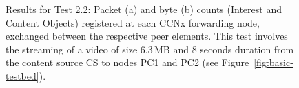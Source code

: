 \begin{figure}[H]
    \centering



    \cprotect\caption{Results for Test 2.2: Packet (a) and byte (b) 
        counts (Interest and 
        Content Objects) registered at each CCNx forwarding node, exchanged 
        between the respective peer elements. This test involves the 
        streaming of a video of size 6.3\,MB and 8 seconds duration from 
        the content source CS to nodes PC1 and PC2 (see Figure~\ref{fig:basic-testbed}).}
    \label{fig:video-sep-abs}

\end{figure}

